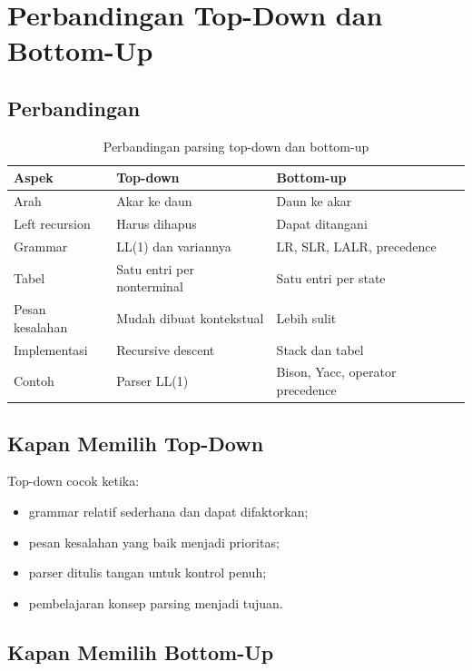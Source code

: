 \section{Perbandingan Top-Down dan Bottom-Up}
\label{sec:ch11-perbandingan}

\subsection{Perbandingan}

\begin{table}[H]
\centering
\caption{Perbandingan parsing top-down dan bottom-up}
\label{tab:ch11-perbandingan}
\begin{tabularx}{\textwidth}{@{}lXX@{}}
\toprule
\textbf{Aspek} & \textbf{Top-down} & \textbf{Bottom-up} \\
\midrule
Arah & Akar ke daun & Daun ke akar \\
Left recursion & Harus dihapus & Dapat ditangani \\
Grammar & LL(1) dan variannya & LR, SLR, LALR, precedence \\
Tabel & Satu entri per nonterminal & Satu entri per state \\
Pesan kesalahan & Mudah dibuat kontekstual & Lebih sulit \\
Implementasi & Recursive descent & Stack dan tabel \\
Contoh & Parser LL(1) & Bison, Yacc, operator precedence \\
\bottomrule
\end{tabularx}
\end{table}

\subsection{Kapan Memilih Top-Down}

Top-down cocok ketika:
\begin{itemize}[leftmargin=*]
  \item grammar relatif sederhana dan dapat difaktorkan;
  \item pesan kesalahan yang baik menjadi prioritas;
  \item parser ditulis tangan untuk kontrol penuh;
  \item pembelajaran konsep parsing menjadi tujuan.
\end{itemize}

\subsection{Kapan Memilih Bottom-Up}


